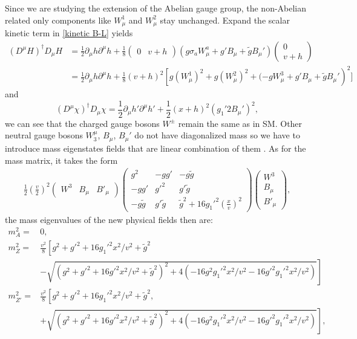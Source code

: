 \documentclass{report}
\newcommand{\nn}{\nonumber}
\numberwithin{equation}{section}
\begin{document}
Since we are studying the extension of the Abelian gauge group, the non-Abelian related only components like $W^1_\mu$ and $W^2_\mu$ stay unchanged. Expand the scalar kinetic term in \eqref{kinetic B-L} yields
\begin{align}
 (D^\mu H)^\dagger D_\mu H&=\frac{1}{2}\partial_\mu h \partial^\mu h+\frac{1}{8} \begin{pmatrix}
 0 &v+h
 \end{pmatrix} ( g\sigma_a W_\mu^a+g' B_\mu+  \tilde{g} B_\mu')\begin{pmatrix}
 0\\v+h
 \end{pmatrix}\nn\\
 &=\frac{1}{2}\partial_\mu h \partial^\mu h+ \frac{1}{8}(v+h)^2\left[g(W_\mu^1)^2+ g(W_\mu^2)^2+ (-gW_\mu^3+g' B_\mu +\tilde{g}B_\mu'\right)^2]\label{Higgskin}
 \end{align} 
and
\begin{equation}
 (D^\mu\chi)^\dagger D_\mu\chi=\frac{1}{2}\partial_\mu h' \partial^\mu h'+\frac{1}{2}(x+h)^2(g_1' 2 B_\mu')^2\label{Higgskin2},
\end{equation}
we can see that the charged gauge bosons $W^\pm$ remain the same as in SM. Other neutral gauge bosons $ W_3^\mu$, $ B_\mu$, $B_\mu'$  do not have diagonalized mass so we have to introduce mass eigenstates fields that are  linear combination of them . As for the mass matrix, it takes  the form
\begin{align}
\frac{1}{2}\left(\frac{v}{2}\right)^2 \begin{pmatrix}
W^3& B_\mu & B'_\mu
\end{pmatrix}\begin{pmatrix}
g^2& -g g'& -g \tilde{g}\\
-g g'&g'^2& g' \tilde{g}\\
-g \tilde{g}& g' \tilde{g} &\tilde{g}^2+ 16 g_1'^2\left(\frac{x}{v}\right)^2
\end{pmatrix}\begin{pmatrix}
W^3\\ B_\mu \\ B'_\mu
\end{pmatrix},
\end{align}
the mass eigenvalues of the new physical fields then are:
\begin{align}
m^2_A=&0,\\
m^2_Z=&\frac{v^2}{8}\left[g^2+g'^2+16 g_1'^2 x^2/v^2+\tilde{g}^2\right.\nn\\ 
&\left.-\sqrt{\left(g^2+{g'}^2+16 {g'}^2 {x^2/v^2}+{\tilde{g}}^2\right)^2+4 \left(-16 g^2 {g_1'}^2 {x^2/v^2}-16 {g'}^2 {g_1'}^2 {x^2/v^2}\right)}\right]\\
m^2_{Z'}=&\frac{v^2}{8}\left[ g^2+{g'}^2+16 {g_1'}^2 {x^2/v^2}+{\tilde{g}}^2\right.,\nn\\
&+\left.\sqrt{\left(g^2+{g'}^2+16 {g'}^2 {x^2/v^2}+{\tilde{g}}^2\right)^2+4 \left(-16 g^2 {g_1'}^2 {x^2/v^2}-16 {g'}^2 {g_1'}^2 {x^2/v^2}\right)}\right],
\end{align}
\end{document}
